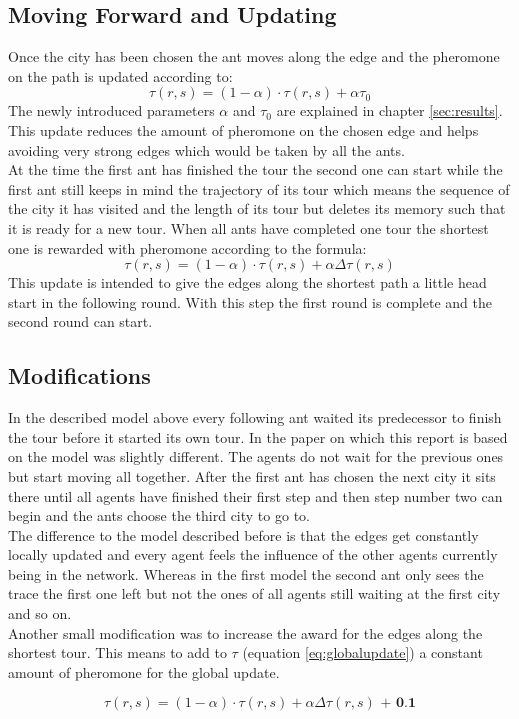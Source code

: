 \subsection{Moving Forward and Updating}
Once the city has been chosen the ant moves along the edge and the pheromone on the path is updated according to:
\begin{equation}
\tau (r,s) = (1-\alpha)\cdot \tau(r,s) + \alpha \tau_0
\label{eq:loctauupdate}
\end{equation}
The newly introduced parameters $\alpha$ and $\tau_0$ are explained in chapter \ref{sec:results}. This update reduces the amount of pheromone on the chosen edge and helps avoiding very strong edges which would be taken by all the ants. \\
At the time the first ant has finished the tour the second one can start while the first ant still keeps in mind the trajectory of its tour which means the sequence of the city it has visited and the length of its tour but deletes its memory such that it is ready for a new tour. When all ants have completed one tour the shortest one is rewarded with pheromone according to the formula:
\begin{equation}
\tau(r,s) = (1-\alpha)\cdot \tau(r,s) + \alpha \Delta \tau(r,s)
\label{eq:globalupdate}
\end{equation}
This update is intended to give the edges along the shortest path a little head start in the following round. With this step the first round is complete and the second round can start.

\subsection{Modifications}

In the described model above every following ant waited its predecessor to finish the tour before it started its own tour. In the paper on which this report is based on the model was slightly different. The agents do not wait for the previous ones but start moving all together. After the first ant has chosen the next city it sits there until all agents have finished their first step and then step number two can begin and the ants choose the third city to go to. \\
The difference to the model described before is that the edges get constantly locally updated and every agent feels the influence of the other agents currently being in the network. Whereas in the first model the second ant only sees the trace the first one left but not the ones of all agents still waiting at the first city and so on. \\
Another small modification was to increase the award for the edges along the shortest tour. This means to add to $\tau$ (equation \ref{eq:globalupdate}) a constant amount of pheromone for the global update.

\begin{equation}
\tau(r,s) = (1-\alpha)\cdot \tau(r,s) + \alpha \Delta \tau(r,s)\textbf{ + 0.1}
\label{eq:globalupdate2}
\end{equation}